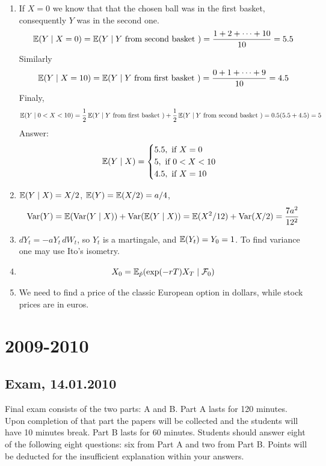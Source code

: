 \documentclass[12pt, a4paper]{article}
\newcommand{\cF}{\mathcal{F}}
\begin{document}
\begin{enumerate}
\item If $X=0$ we know that that the chosen ball was in the first basket, consequently $Y$ was in the second one.
\[
\operatorname{\mathbb{E}}(Y \mid X=0) = \operatorname{\mathbb{E}}(Y \mid Y \text{ from second basket } )=\frac{1+2+\dots+10}{10}=5.5
\]
Similarly
\[
\operatorname{\mathbb{E}}(Y \mid X=10) = \operatorname{\mathbb{E}}(Y \mid Y \text{ from first basket } )=\frac{0+1+\dots+9}{10}=4.5
\]
Finaly,
\[
\operatorname{\mathbb{E}}(Y \mid 0<X<10) = \frac{1}{2}\operatorname{\mathbb{E}}(Y \mid Y \text{ from first basket }) +\frac{1}{2}\operatorname{\mathbb{E}}(Y \mid Y \text{ from second basket }) = 0.5 (5.5 + 4.5) = 5
\]
Answer:
\[
\operatorname{\mathbb{E}}(Y \mid X) =
 \begin{cases}
   5.5, \text{ if } X=0\\
  5, \text{ if } 0<X<10\\
 4.5, \text{ if }  X=10\\
   \end{cases}
\]

\item $\operatorname{\mathbb{E}}(Y \mid X)=X/2$, $\operatorname{\mathbb{E}}(Y)=\operatorname{\mathbb{E}}(X/2)=a/4$,
\[
\operatorname{Var}(Y)=\operatorname{\mathbb{E}}(\operatorname{Var}(Y \mid X))+\operatorname{Var}(\operatorname{\mathbb{E}}(Y \mid X))=\operatorname{\mathbb{E}}(X^2/12)+\operatorname{Var}(X/2)=\frac{7a^2}{12^2}
\]
\item $dY_t=-a Y_t \, dW_t$, so $Y_t$ is a martingale, and $\operatorname{\mathbb{E}}(Y_t)=Y_0=1$. To find variance one may use Ito's isometry.


\item 
\[
X_0 = \E_{\tilde{p}}( \exp( - rT )X_{T} \mid \cF_0)
\]


\item We need to find a price of the classic European option in dollars, while
stock prices are in euros.

\end{enumerate}

\section{2009-2010}

\subsection{Exam, 14.01.2010}

Final exam consists of the two parts: A and B. Part A lasts for 120 minutes.
Upon completion of that part the papers will be collected and the students will have 10 minutes break.
Part B lasts for 60 minutes.
Students should answer eight of the following eight questions: six from Part A and two from Part B.
Points will be deducted for the insufficient explanation within your answers.
\end{document}
